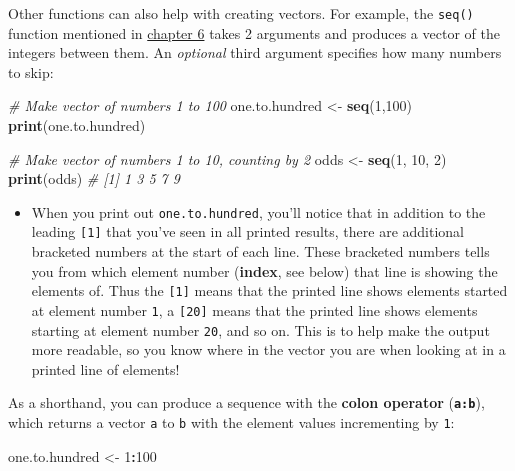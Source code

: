 \documentclass[]{book}
\newenvironment{Shaded}{\begin{snugshade}}{\end{snugshade}}
\newcommand{\KeywordTok}[1]{\textcolor[rgb]{0.13,0.29,0.53}{\textbf{#1}}}
\newcommand{\DecValTok}[1]{\textcolor[rgb]{0.00,0.00,0.81}{#1}}
\newcommand{\StringTok}[1]{\textcolor[rgb]{0.31,0.60,0.02}{#1}}
\newcommand{\CommentTok}[1]{\textcolor[rgb]{0.56,0.35,0.01}{\textit{#1}}}
\newcommand{\OperatorTok}[1]{\textcolor[rgb]{0.81,0.36,0.00}{\textbf{#1}}}
\newcommand{\NormalTok}[1]{#1}
\providecommand{\tightlist}{%
  \setlength{\itemsep}{0pt}\setlength{\parskip}{0pt}}
\theoremstyle{definition}
\theoremstyle{definition}
\theoremstyle{remark}
\begin{document}
Other functions can also help with creating vectors. For example, the
\texttt{seq()} function mentioned in
\protect\hyperlink{functions}{chapter 6} takes 2 arguments and produces
a vector of the integers between them. An \emph{optional} third argument
specifies how many numbers to skip:

\begin{Shaded}
\begin{Highlighting}[]
\CommentTok{# Make vector of numbers 1 to 100}
\NormalTok{one.to.hundred <-}\StringTok{ }\KeywordTok{seq}\NormalTok{(}\DecValTok{1}\NormalTok{,}\DecValTok{100}\NormalTok{)}
\KeywordTok{print}\NormalTok{(one.to.hundred)}

\CommentTok{# Make vector of numbers 1 to 10, counting by 2}
\NormalTok{odds <-}\StringTok{ }\KeywordTok{seq}\NormalTok{(}\DecValTok{1}\NormalTok{, }\DecValTok{10}\NormalTok{, }\DecValTok{2}\NormalTok{)}
\KeywordTok{print}\NormalTok{(odds)  }\CommentTok{# [1] 1 3 5 7 9}
\end{Highlighting}
\end{Shaded}

\begin{itemize}
\tightlist
\item
  When you print out \texttt{one.to.hundred}, you'll notice that in
  addition to the leading \texttt{{[}1{]}} that you've seen in all
  printed results, there are additional bracketed numbers at the start
  of each line. These bracketed numbers tells you from which element
  number (\textbf{index}, see below) that line is showing the elements
  of. Thus the \texttt{{[}1{]}} means that the printed line shows
  elements started at element number \texttt{1}, a \texttt{{[}20{]}}
  means that the printed line shows elements starting at element number
  \texttt{20}, and so on. This is to help make the output more readable,
  so you know where in the vector you are when looking at in a printed
  line of elements!
\end{itemize}

As a shorthand, you can produce a sequence with the \textbf{colon
operator} (\textbf{\texttt{a:b}}), which returns a vector \texttt{a} to
\texttt{b} with the element values incrementing by \texttt{1}:

\begin{Shaded}
\begin{Highlighting}[]
\NormalTok{one.to.hundred <-}\StringTok{ }\DecValTok{1}\OperatorTok{:}\DecValTok{100}
\end{Highlighting}
\end{Shaded}
\end{document}
